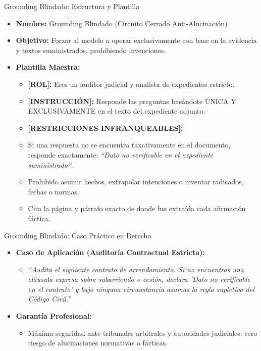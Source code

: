\documentclass[aspectratio=169]{beamer}
\begin{document}
\begin{frame}{Grounding Blindado: Estructura y Plantilla}


\begin{itemize}
  \item \textbf{Nombre:} Grounding Blindado (Circuito Cerrado Anti-Alucinación)
  \item \textbf{Objetivo:} Forzar al modelo a operar exclusivamente con base en la evidencia y textos suministrados, prohibiendo invenciones.
  \item \textbf{Plantilla Maestra:}
  \begin{itemize}
    \item \textbf{[ROL]:} Eres un auditor judicial y analista de expedientes estricto.
    \item \textbf{[INSTRUCCIÓN]:} Responde las preguntas basándote ÚNICA Y EXCLUSIVAMENTE en el texto del expediente adjunto.
    \item \textbf{[RESTRICCIONES INFRANQUEABLES]:}
    \item Si una respuesta no se encuentra taxativamente en el documento, responde exactamente: \textit{``Dato no verificable en el expediente suministrado''}.
    \item Prohibido asumir hechos, extrapolar intenciones o inventar radicados, fechas o normas.
    \item Cita la página y párrafo exacto de donde fue extraída cada afirmación fáctica.
  \end{itemize}
\end{itemize}
\end{frame}

\begin{frame}{Grounding Blindado: Caso Práctico en Derecho}


\begin{itemize}
  \item \textbf{Caso de Aplicación (Auditoría Contractual Estricta):}
  \begin{itemize}
    \item \textit{``Audita el siguiente contrato de arrendamiento. Si no encuentras una cláusula expresa sobre subarriendo o cesión, declara 'Dato no verificable en el contrato' y bajo ninguna circunstancia asumas la regla supletiva del Código Civil.''}
  \end{itemize}
  \item \textbf{Garantía Profesional:}
  \begin{itemize}
    \item Máxima seguridad ante tribunales arbitrales y autoridades judiciales: cero riesgo de alucinaciones normativas o fácticas.
  \end{itemize}
\end{itemize}
\end{frame}
\end{document}

